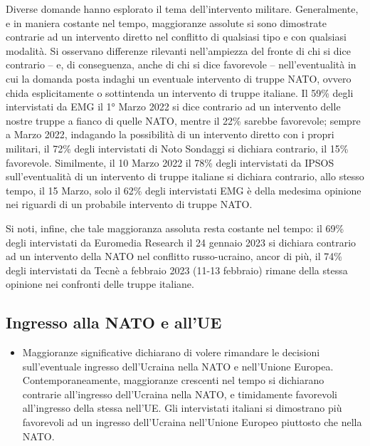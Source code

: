 \documentclass[
  openany]{book}
\providecommand{\tightlist}{%
  \setlength{\itemsep}{0pt}\setlength{\parskip}{0pt}}
\begin{document}
Diverse domande hanno esplorato il tema dell'intervento militare. Generalmente, e in maniera costante nel tempo, maggioranze assolute si sono dimostrate contrarie ad un intervento diretto nel conflitto di qualsiasi tipo e con qualsiasi modalità. Si osservano differenze rilevanti nell'ampiezza del fronte di chi si dice contrario -- e, di conseguenza, anche di chi si dice favorevole -- nell'eventualità in cui la domanda posta indaghi un eventuale intervento di truppe NATO, ovvero chida esplicitamente o sottintenda un intervento di truppe italiane. Il 59\% degli intervistati da EMG il 1° Marzo 2022 si dice contrario ad un intervento delle nostre truppe a fianco di quelle NATO, mentre il 22\% sarebbe favorevole; sempre a Marzo 2022, indagando la possibilità di un intervento diretto con i propri militari, il 72\% degli intervistati di Noto Sondaggi si dichiara contrario, il 15\% favorevole. Similmente, il 10 Marzo 2022 il 78\% degli intervistati da IPSOS sull'eventualità di un intervento di truppe italiane si dichiara contrario, allo stesso tempo, il 15 Marzo, solo il 62\% degli intervistati EMG è della medesima opinione nei riguardi di un probabile intervento di truppe NATO.

Si noti, infine, che tale maggioranza assoluta resta costante nel tempo: il 69\% degli intervistati da Euromedia Research il 24 gennaio 2023 si dichiara contrario ad un intervento della NATO nel conflitto russo-ucraino, ancor di più, il 74\% degli intervistati da Tecnè a febbraio 2023 (11-13 febbraio) rimane della stessa opinione nei confronti delle truppe italiane.

\hypertarget{ingresso-alla-nato-e-allue}{%
\subsection{Ingresso alla NATO e all'UE}\label{ingresso-alla-nato-e-allue}}

\begin{itemize}
\tightlist
\item
  Maggioranze significative dichiarano di volere rimandare le decisioni sull'eventuale ingresso dell'Ucraina nella NATO e nell'Unione Europea. Contemporaneamente, maggioranze crescenti nel tempo si dichiarano contrarie all'ingresso dell'Ucraina nella NATO, e timidamente favorevoli all'ingresso della stessa nell'UE. Gli intervistati italiani si dimostrano più favorevoli ad un ingresso dell'Ucraina nell'Unione Europeo piuttosto che nella NATO.
\end{itemize}
\end{document}
